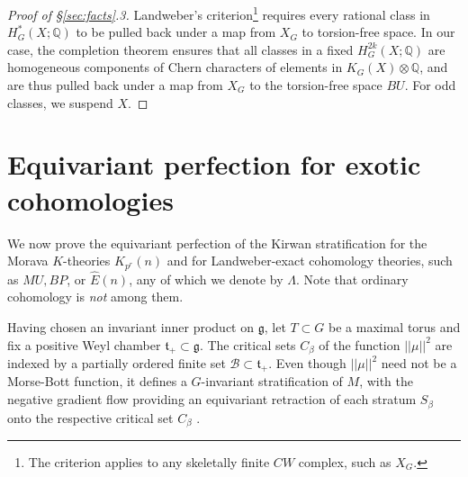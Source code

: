 \documentclass[11pt, reqno]{amsart}
\theoremstyle{plain}
\theoremstyle{definition}
\newcommand{\landw}{\Lambda}
\newcommand{\En}{\widehat{E}(n)}
\begin{document}
\begin{proof}[Proof of \S\ref{sec:facts}.3]
Landweber's criterion\footnote{The criterion applies to any skeletally finite $CW$ complex, such as $X_G$.} 
requires every rational class in $H^*_G(X;\mathbb{Q})$ to be pulled back under a map from $X_G$ 
to torsion-free space. In our case, the completion theorem \cite{AtiyahSegal} ensures that all classes in a fixed $H^{2k}_G(X;\mathbb{Q})$ are 
homogeneous components of Chern characters of elements in $K_G(X)\otimes\mathbb{Q}$, and are thus pulled 
back under a map from $X_G$ to the torsion-free space $BU$. 
For odd classes, we suspend $X$. 
\end{proof}



\section{Equivariant perfection for exotic cohomologies}
\label{sec:perfect}
We now prove the equivariant perfection of the Kirwan stratification for the Morava $K$-theories 
$K_{p^r}(n)$ and for Landweber-exact cohomology theories, such as $MU, BP$, or $\En$, any of which we 
denote by $\landw$. Note that ordinary cohomology is \emph{not} among them. 

Having chosen an invariant inner product on $\mathfrak{g}$, let $T \subset G$ be a maximal torus and 
fix a positive Weyl chamber $\mathfrak{t}_{+} \subset \mathfrak{g}$.    
The critical sets $C_{\beta}$ of the function $||\mu||^2$ are indexed by a partially ordered finite set $\mathcal{B} \subset \mathfrak{t}_{+}$. Even though $||\mu||^2$  need not be a Morse-Bott function, it defines a $G$-invariant 
stratification of $M$, with the negative gradient flow providing an equivariant retraction of each stratum $S_\beta$  onto the respective critical set $C_\beta$ \cite{Lerman}. 
\end{document}

